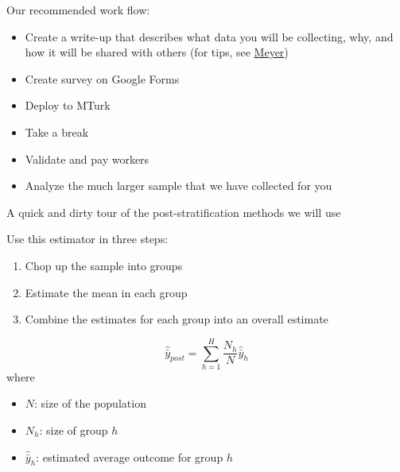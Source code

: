 \documentclass[aspectratio=169]{beamer}
\begin{document}
\begin{frame}

Our recommended work flow:
\begin{itemize}
\item Create a write-up that describes what data you will be collecting, why, and how it will be shared with others (for tips, see \href{https://doi.org/10.1177/2515245917747656}{Meyer})
\item Create survey on Google Forms
\item Deploy to MTurk
\item Take a break
\pause
\item Validate and pay workers
\pause
\item Analyze the much larger sample that we have collected for you
\end{itemize}

\end{frame}
\begin{frame}

A quick and dirty tour of the post-stratification methods we will use

\end{frame}
\begin{frame}

Use this estimator in three steps:
\begin{enumerate}
\item Chop up the sample into groups \pause
\item Estimate the mean in each group \pause
\item Combine the estimates for each group into an overall estimate
\end{enumerate}
\pause

\vfill

\begin{equation*}
\hat{\bar{y}}_{post} = \sum_{h=1}^H \frac{N_h}{N} \hat{\bar{y}}_h
\end{equation*}
where 
\begin{itemize}
\item $N$: size of the population
\item $N_h$: size of group $h$
\item $\hat{\bar{y}}_h$: estimated average outcome for group $h$
\end{itemize}

\end{frame}
\end{document}

